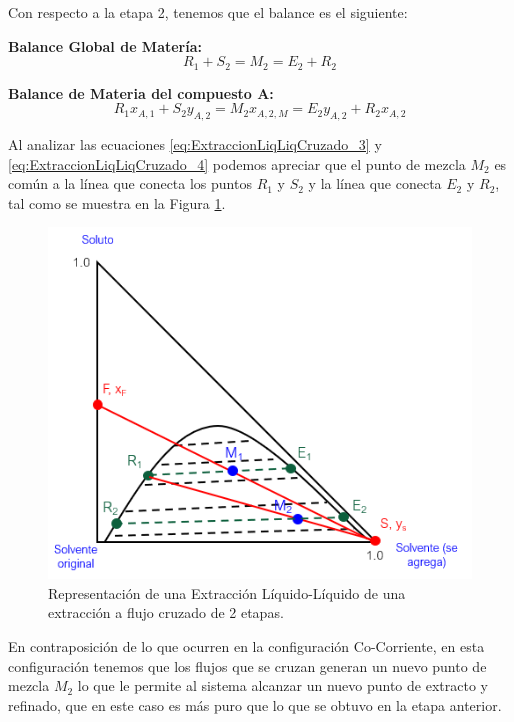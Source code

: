 \documentclass[11pt]{book}
\begin{document}
Con respecto a la etapa 2, tenemos que el balance es el siguiente:

\textbf{Balance Global de Matería:}
\begin{equation}
    \label{eq:ExtraccionLiqLiqCruzado_3}
    R_1 + S_2 = M_2 = E_2 + R_2
\end{equation}

\textbf{Balance de Materia del compuesto A:}
\begin{equation}
    \label{eq:ExtraccionLiqLiqCruzado_4}
   R_1 x_{A,1} + S_2 y_{A,2} = M_2 x_{A,2,M} = E_2 y_{A,2} + R_2 x_{A,2}
\end{equation}

Al analizar las ecuaciones \ref{eq:ExtraccionLiqLiqCruzado_3} y \ref{eq:ExtraccionLiqLiqCruzado_4} podemos apreciar que el punto de mezcla $M_2$ es común a la línea que conecta los puntos $R_1$ y $S_2$ y la línea que conecta $E_2$ y $R_2$, tal como se muestra en la Figura \ref{fig:ExtraccionLiqLiqCruzado_3}.

\begin{figure}
    \centering
    \includegraphics{img/LiquidoLiquido/ExtracionLiqLiqCruzado_3.PNG}
    \caption{Representación de una Extracción Líquido-Líquido de una extracción a flujo cruzado de 2 etapas.}
    \label{fig:ExtraccionLiqLiqCruzado_3}
\end{figure}

En contraposición de lo que ocurren en la configuración Co-Corriente, en esta configuración tenemos que los flujos que se cruzan generan un nuevo punto de mezcla $M_2$ lo que le permite al sistema alcanzar un nuevo punto de extracto y refinado, que en este caso es más puro que lo que se obtuvo en la etapa anterior.
\end{document}
